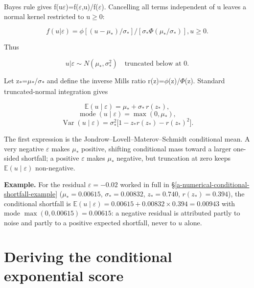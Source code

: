 Bayes\textquotesingle{} rule gives f(u\textbar \ensuremath{\varepsilon })=f(\ensuremath{\varepsilon },u)/f(\ensuremath{\varepsilon }).
Cancelling all terms independent of u leaves a normal kernel restricted
to u\ensuremath{\geq }0:

\begin{equation}
f(u|\varepsilon )= \phi [(u-\mu _{*})/\sigma _{*}] / [\sigma _{*}\Phi (\mu _{*}/\sigma _{*})], u\geq 0.
\end{equation}

Thus

\begin{equation}
u|\varepsilon  \sim N(\mu _{*},\sigma _{*}^{2}) \quad \text{truncated below at }0.
\end{equation}

Let z\textsubscript{*}=\ensuremath{\mu }\textsubscript{*}/\ensuremath{\sigma }\textsubscript{*} and define
the inverse Mills ratio r(z)=\ensuremath{\phi }(z)/\ensuremath{\Phi }(z). Standard truncated-normal
integration gives

\begin{equation}\label{eq:ch14-jlms}
\mathbb{E}(u\mid\varepsilon )=\mu _{*}+\sigma _{*}\,r(z_{*}),
\end{equation}
\begin{equation}
\operatorname{mode}(u\mid\varepsilon )=\max(0,\mu _{*}),
\end{equation}
\begin{equation}
\operatorname{Var}(u\mid\varepsilon )=\sigma _{*}^{2}\bigl[1-z_{*}r(z_{*})-r(z_{*})^{2}\bigr].
\end{equation}

The first expression is the Jondrow--Lovell--Materov--Schmidt conditional
mean. A very negative $\varepsilon$ makes $\mu_*$ positive, shifting
conditional mass toward a larger one-sided shortfall; a positive
$\varepsilon$ makes $\mu_*$ negative, but truncation at zero keeps
$\mathbb{E}(u\mid\varepsilon)$ non-negative.

\textbf{Example.} For the residual $\varepsilon=-0.02$ worked in full in
\S\ref{a-numerical-conditional-shortfall-example} ($\mu_*=0.00615$,
$\sigma_*=0.00832$, $z_*=0.740$, $r(z_*)=0.394$), the conditional shortfall
is $\mathbb{E}(u\mid\varepsilon)=0.00615+0.00832\times0.394=0.00943$ with
mode $\max(0,0.00615)=0.00615$: a negative residual is attributed partly to
noise and partly to a positive expected shortfall, never to $u$ alone.

\hypertarget{deriving-the-conditional-exponential-score}{%
\section{Deriving the conditional exponential
score}\label{deriving-the-conditional-exponential-score}}

